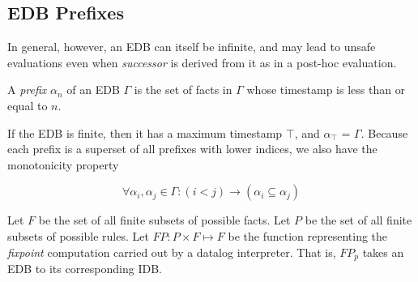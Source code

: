 



\subsection{EDB Prefixes}

In general, however, an EDB can itself be infinite, and may lead to unsafe evaluations even when \emph{successor} is derived from it
as in a post-hoc evaluation.

\begin{definition}
A \emph{prefix} $\alpha_{n}$ of an EDB $\Gamma$ is the set of facts in $\Gamma$ whose timestamp is less than or equal to $n$.
\end{definition}

If the EDB is finite, then it has a maximum timestamp $\top$, and $\alpha_{\top}$ = $\Gamma$.  Because each prefix is a superset of all 
prefixes with lower indices, we also have the monotonicity property

\begin{equation}
\forall \alpha_{i}, \alpha_{j} \in \Gamma : (i < j) \to (\alpha_{i} \subseteq \alpha_{j})
\end{equation}



\begin{definition}
Let $F$ be the set of all finite subsets of possible facts.   
Let $P$ be the set of all finite subsets of possible rules.
Let $FP : P \times F \mapsto F$ be the function representing the
\emph{fixpoint} computation carried out by a datalog interpreter.  That is, $FP_p$ takes an EDB to its corresponding IDB.
\end{definition}

